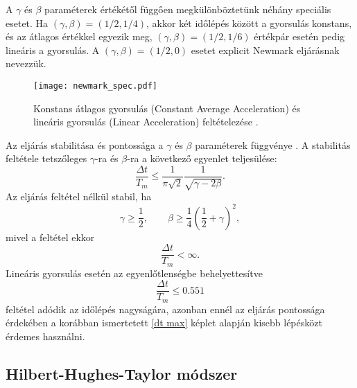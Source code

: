A $\gamma$ és $\beta$ paraméterek értékétől függően megkülönböztetünk néhány speciális esetet\cite{chopra,crcontthe}. Ha $(\gamma,\beta)=(1/2,1/4)$, akkor két időlépés között a gyorsulás konstans, és az átlagos értékkel egyezik meg, $(\gamma,\beta)=(1/2,1/6)$ értékpár esetén pedig lineáris a gyorsulás. A $(\gamma,\beta)=(1/2,0)$ esetet explicit Newmark eljárásnak nevezzük.

\begin{figure}[h!]
\centering
\texttt{[image: newmark\_spec.pdf]}
\caption[Konstans átlagos gyorsulás és lineáris gyorsulás feltételezése]{Konstans átlagos gyorsulás (Constant Average Acceleration) és lineáris gyorsulás (Linear Acceleration) feltételezése \cite{chopra}.}
\label{fig:newmark spec}
\end{figure}

Az eljárás stabilitása és pontossága a $\gamma$ és $\beta$ paraméterek függvénye \cite{chopra}. A stabilitás feltétele tetszőleges $\gamma$-ra és $\beta$-ra a következő egyenlet teljesülése:
\begin{equation*}
\frac{\Delta{t}}{T_m}\leq\frac{1}{\pi\sqrt{2}}\frac{1}{\sqrt{\gamma-2\beta}}.
\end{equation*}
 Az eljárás feltétel nélkül stabil, ha
\begin{equation*}
\gamma\geq\frac{1}{2}, \qquad \beta\geq\frac{1}{4}\left(\frac{1}{2}+\gamma\right)^2, 
\end{equation*}
mivel a feltétel ekkor
\begin{equation*}
\frac{\Delta{t}}{T_m}<\infty.
\end{equation*}
Lineáris gyorsulás esetén  az egyenlőtlenségbe behelyettesítve
\begin{equation*}
\frac{\Delta{t}}{T_m}\leq0.551 
\end{equation*}
feltétel adódik az időlépés nagyságára, azonban ennél az eljárás pontossága érdekében a korábban ismertetett \eqref{dt max} képlet alapján kisebb lépésközt érdemes használni.

\subsection{Hilbert-Hughes-Taylor módszer}

{\ }

